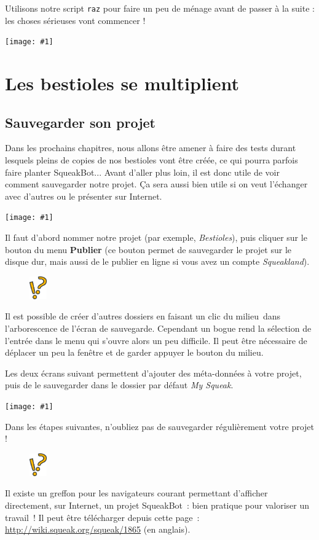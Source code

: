 \documentclass[a4paper,12pt]{book}
\def\appName{SqueakBot}
\def\cm{clic du milieu~}
\newcommand{\capture}[1]
{
\begin{center}
	\texttt{[image: \#1]}
\end{center}
}
\newcommand{\code}[1]{\texttt{#1}}
\newcommand{\important}[1]{\textbf{#1}}
\newcommand{\astuce}[1]
{
\begin{framed}
\begin{figure}
	\vspace{-15pt}
	\includegraphics[width=2.0em]{astuce.png}
\end{figure}
#1
\end{framed}
}
\let\myMargin\marginpar
\renewcommand{\marginpar}[1]{\myMargin{{\scriptsize \sffamily #1}}}
\begin{document}
Utilisons notre script \code{raz} pour faire un peu de ménage avant de passer à la suite : les choses sérieuses vont commencer !

\capture{bestioles2.png}

\chapter{Les bestioles se multiplient}

\section{Sauvegarder son projet}

Dans les prochains chapitres, nous allons être amener à faire des tests durant lesquels pleins de \og copies \fg de nos bestioles vont être créée, ce qui pourra parfois faire \og planter \fg \appName... Avant d'aller plus loin, il est donc utile de voir comment sauvegarder notre projet. Ça sera aussi bien utile si on veut l'échanger avec d'autres ou le présenter sur Internet.

\capture{46bis.png}

Il faut d'abord nommer notre projet (par exemple, \textit{Bestioles}), puis cliquer sur le bouton du menu \important{Publier} (ce bouton permet de sauvegarder le projet sur le disque dur, mais aussi de le publier en ligne si vous avez un compte \textit{Squeakland}).

\astuce{Il est possible de créer d'autres dossiers en faisant un \cm dans l'arborescence de l'écran de sauvegarde. Cependant un bogue rend la sélection de l'entrée dans le menu qui s'ouvre alors un peu difficile. Il peut être nécessaire de déplacer un peu la fenêtre et de garder appuyer le bouton du milieu.}
Les deux écrans suivant permettent d'ajouter des méta-données à votre projet, puis de le sauvegarder dans le dossier par défaut \textit{My Squeak}.

\capture{47.png}

Dans les étapes suivantes, n'oubliez pas de sauvegarder régulièrement votre projet !

\astuce{Il existe un greffon pour les navigateurs courant permettant d'afficher directement, sur Internet, un projet \appName~: bien pratique pour valoriser un travail~! Il peut être télécharger depuis cette page~: \url{http://wiki.squeak.org/squeak/1865} (en anglais).}
\end{document}
